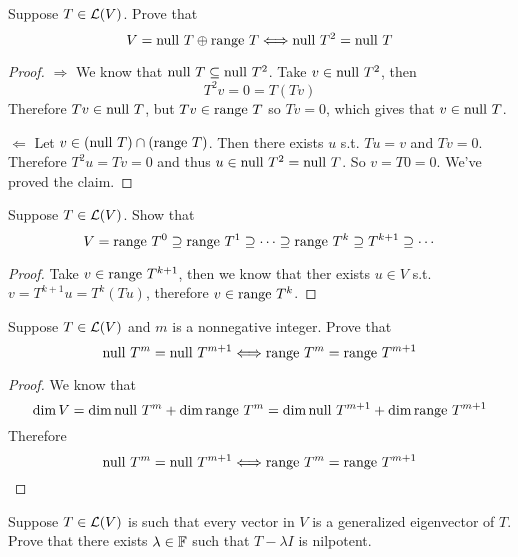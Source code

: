 \documentclass{extarticle}
\begin{document}
\begin{problem}{3}
    Suppose \(T \in \mathcal{L}(V)\). Prove that 
    \[V = \text{null } T \oplus \text{range } T \Longleftrightarrow \text{null } T^2 = \text{null } T\]
\end{problem}

\begin{proof}
\(\Rightarrow\) We know that \(\text{null } T \subseteq \text{null } T^2\). Take \(v \in \text{null } T^2\), then 
\[T^2 v = 0 = T(Tv)\]
Therefore \(Tv \in \text{null } T\), but \(Tv \in \text{range } T\) so \(Tv = 0\), which gives that 
\(v \in \text{null } T\).

\(\Leftarrow\) Let \(v \in (\text{null } T) \cap (\text{range } T)\). Then there exists \(u\) s.t. 
\(Tu = v\) and \(Tv = 0\). Therefore \(T^2u = Tv = 0\) and thus \(u \in \text{null } T^2 
=\text{null } T\). So \(v = T0  = 0\). We've proved the claim.
\end{proof}


\begin{problem}{6}
    Suppose \(T \in \mathcal{L}(V)\). Show that 
    \[V = \text{range } T^0 \supseteq \text{range } T^1 \supseteq \cdots \supseteq \text{range } T^k \supseteq T^{k+1} \supseteq \cdots\]
\end{problem}

\begin{proof}
Take \(v \in \text{range } T^{k+1}\), then we know that ther exists \(u \in V\) s.t. 
\(v = T^{k+1} u = T^{k}(Tu)\), therefore \(v \in \text{range } T^k\). 
\end{proof}

\begin{problem}{9}
    Suppose \(T \in \mathcal{L}(V)\) and \(m\) is a nonnegative integer. Prove that 
    \[\text{null } T^m = \text{null } T^{m+1} \Longleftrightarrow \text{range } T^m = \text{range } T^{m+1}\]
\end{problem}

\begin{proof}
We know that 
\[\dim V = \dim \text{null } T^m + \dim \text{range } T^m = \dim \text{null } T^{m+1} + \dim \text{range } T^{m+1}\]
Therefore 
\[\text{null } T^m = \text{null } T^{m+1} \Longleftrightarrow \text{range } T^m = \text{range } T^{m+1}\]
\end{proof}

\begin{problem}{12}
    Suppose \(T \in \mathcal{L}(V)\) is such that every vector in \(V\) is a generalized eigenvector of \(T\). 
    Prove that there exists \(\lambda \in \mathbb{F}\) such that \(T - \lambda I\) is nilpotent.
\end{problem}
\end{document}
